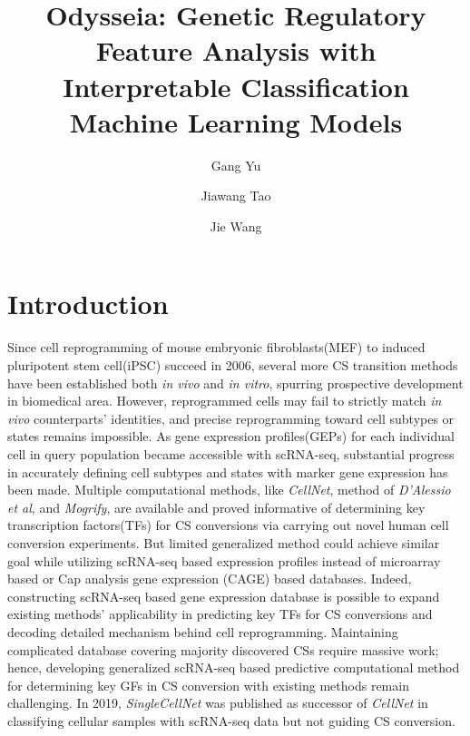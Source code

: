 \documentclass[fleqn,10pt]{wlscirep}
\title{Odysseia: Genetic Regulatory Feature Analysis with Interpretable Classification Machine Learning Models}
\author[1,*1]{Gang Yu}
\author[1,]{Jiawang Tao}
\author[1,*2]{Jie Wang}
\affil[1]{Center for Health Research, Guangzhou Institutes of Biomedicine and Health, Chinese Academy of Sciences, Guangzhou 510530, China}
\affil[*1]{Correspondence: gyu17@alumni.jh.edu}
\affil[*2]{Correspondence: wang\_jie01@gibh.ac.cn}
\begin{document}
\flushbottom
\maketitle
%
%
\thispagestyle{empty}
\section*{Introduction}
Since cell reprogramming of mouse embryonic fibroblasts(MEF) to induced pluripotent stem cell(iPSC) succeed in 2006\cite{yamanaka_2006}, several more CS transition methods have been established both \emph{in vivo} and \emph{in vitro}\cite{fibroblast_sertoli_2012,fibro_cardio_2012,mef_hept_2011}, spurring prospective development in biomedical area.
However, reprogrammed cells may fail to strictly match \emph{in vivo} counterparts' identities\cite{ASCL1_dopaminergic_neuron_2021}, and precise reprogramming toward cell subtypes or states remains impossible\cite{cell_repro_review}.
As gene expression profiles(GEPs) for each individual cell in query population became accessible with scRNA-seq, substantial progress in accurately defining cell subtypes and states with marker gene expression has been made\cite{pancreas_subtypes_2016,lung_subtypes_2014}.
Multiple computational methods, like \emph{CellNet}\cite{cellnet_2014}, method of \emph{D’Alessio et al}\cite{dalessio_2015}, and \emph{Mogrify}\cite{mogrify_2016}, are available and proved informative of determining key transcription factors(TFs) for CS conversions via carrying out novel human cell conversion experiments.
But limited generalized method could achieve similar goal while utilizing scRNA-seq based expression profiles instead of microarray based or Cap analysis gene expression (CAGE) based databases.
Indeed, constructing scRNA-seq based gene expression database is possible to expand existing methods' applicability in predicting key TFs for CS conversions and decoding detailed mechanism behind cell reprogramming.
Maintaining complicated database covering majority discovered CSs require massive work; hence, developing generalized scRNA-seq based predictive computational method for determining key GFs in CS conversion with existing methods remain challenging.
In 2019, \emph{SingleCellNet}\cite{scn_2019} was published as successor of \emph{CellNet} in classifying cellular samples with scRNA-seq data but not guiding CS conversion.
\end{document}

